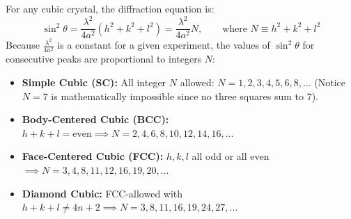 \documentclass[11pt,a4paper]{article}
\begin{document}
For any cubic crystal, the diffraction equation is:
\begin{equation}
\sin^2\theta = \frac{\lambda^2}{4a^2}(h^2 + k^2 + l^2) = \frac{\lambda^2}{4a^2} N, \qquad \text{where } N \equiv h^2 + k^2 + l^2
\end{equation}
Because $\frac{\lambda^2}{4a^2}$ is a constant for a given experiment, the values of $\sin^2\theta$ for consecutive peaks are proportional to integers $N$:

\begin{keybox}
\begin{itemize}[leftmargin=1.5em]
    \item \textbf{Simple Cubic (SC):} All integer $N$ allowed: $N = 1, 2, 3, 4, 5, 6, 8, \dots$ (Notice $N=7$ is mathematically impossible since no three squares sum to 7).
    \item \textbf{Body-Centered Cubic (BCC):} $h+k+l = \text{even} \implies N = 2, 4, 6, 8, 10, 12, 14, 16, \dots$
    \item \textbf{Face-Centered Cubic (FCC):} $h,k,l$ all odd or all even $\implies N = 3, 4, 8, 11, 12, 16, 19, 20, \dots$
    \item \textbf{Diamond Cubic:} FCC-allowed with $h+k+l \neq 4n+2 \implies N = 3, 8, 11, 16, 19, 24, 27, \dots$
\end{itemize}
\end{keybox}
\end{document}
